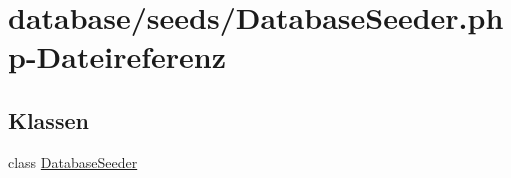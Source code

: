 \hypertarget{DatabaseSeeder_8php}{}\section{database/seeds/\+Database\+Seeder.php-\/\+Dateireferenz}
\label{DatabaseSeeder_8php}
\subsection*{Klassen}
\begin{DoxyCompactItemize}
\item 
class \hyperlink{classDatabaseSeeder}{Database\+Seeder}
\end{DoxyCompactItemize}
